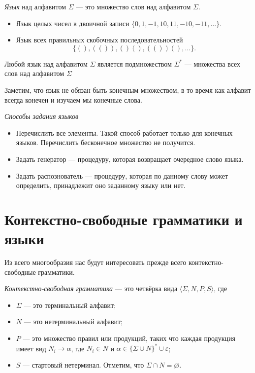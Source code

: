 \begin{definition}
\textit{Язык} над алфавитом $\Sigma$ --- это множество слов над алфавитом $\Sigma$.
\end{definition}

\begin{example}

  \begin{itemize}
    \item Язык целых чисел в двоичной записи $\{0, 1, -1, 10, 11, -10, -11, \dots\}.$
    \item Язык всех правильных скобочных последовательностей $$\{(), (()), ()(), (())(), \dots\}.$$
  \end{itemize}
\end{example}

Любой язык над алфавитом $\Sigma$ является подмножеством $\Sigma^*$ --- множества всех слов над алфавитом $\Sigma$

Заметим, что язык не обязан быть конечным множеством, в то время как алфавит всегда конечен и изучаем мы конечные слова.

\textit{Способы задания языков}
\begin{itemize}
\item Перечислить все элементы. Такой способ работает только для конечных языков. Перечислить бесконечное множество не получится.
\item Задать генератор --- процедуру, которая возвращает очередное слово языка.
\item Задать распознователь --- процедуру, которая по данному слову может определить, принадлежит оно заданному языку или нет.
\end{itemize}


\section{Контекстно-свободные грамматики и языки}\label{CFG}

Из всего многообразия нас будут интересовать прежде всего контекстно-свободные грамматики.

\begin{definition}
\textit{Контекстно-свободная грамматика} --- это четвёрка вида $\langle \Sigma, N, P, S \rangle$, где
\begin{itemize}
  \item $\Sigma$ --- это терминальный алфавит;
  \item $N$ --- это нетерминальный алфавит;
  \item $P$ --- это множество правил или продукций, таких что каждая продукция имеет вид $N_i \to \alpha$, где $N_i \in N$ и $\alpha \in \{\Sigma \cup N\}^* \cup {\varepsilon}$;
  \item $S$ --- стартовый нетерминал.
  Отметим, что $\Sigma \cap N = \varnothing$.
\end{itemize}
\end{definition}

